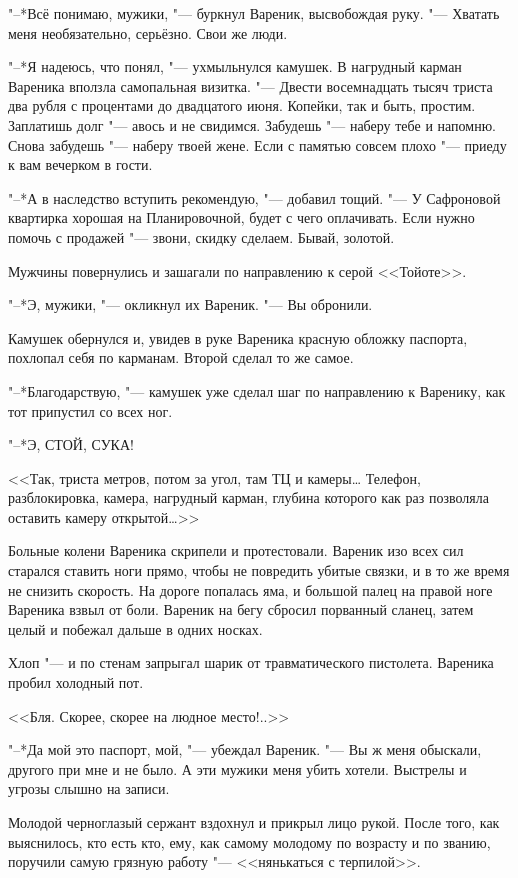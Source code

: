 "--*Всё понимаю, мужики, "--- буркнул Вареник, высвобождая руку.
"--- Хватать меня необязательно, серьёзно.
Свои же люди.

"--*Я надеюсь, что понял, "--- ухмыльнулся камушек.
В нагрудный карман Вареника вползла самопальная визитка.
"--- Двести восемнадцать тысяч триста два рубля с процентами до двадцатого июня.
Копейки, так и быть, простим.
Заплатишь долг "--- авось и не свидимся.
Забудешь "--- наберу тебе и напомню.
Снова забудешь "--- наберу твоей жене.
Если с памятью совсем плохо "--- приеду к вам вечерком в гости.

"--*А в наследство вступить рекомендую, "--- добавил тощий.
"--- У Сафроновой квартирка хорошая на Планировочной, будет с чего оплачивать.
Если нужно помочь с продажей "--- звони, скидку сделаем.
Бывай, золотой.

Мужчины повернулись и зашагали по направлению к серой <<Тойоте>>.

"--*Э, мужики, "--- окликнул их Вареник.
"--- Вы обронили.

Камушек обернулся и, увидев в руке Вареника красную обложку паспорта, похлопал себя по карманам.
Второй сделал то же самое.

"--*Благодарствую, "--- камушек уже сделал шаг по направлению к Варенику, как тот припустил со всех ног.

"--*Э, СТОЙ, СУКА!

<<Так, триста метров, потом за угол, там ТЦ и камеры\ldots{}
Телефон, разблокировка, камера, нагрудный карман, глубина которого как раз позволяла оставить камеру открытой\ldots{}>>

Больные колени Вареника скрипели и протестовали.
Вареник изо всех сил старался ставить ноги прямо, чтобы не повредить убитые связки, и в то же время не снизить скорость.
На дороге попалась яма, и большой палец на правой ноге Вареника взвыл от боли.
Вареник на бегу сбросил порванный сланец, затем целый и побежал дальше в одних носках.

Хлоп "--- и по стенам запрыгал шарик от травматического пистолета.
Вареника пробил холодный пот.

<<Бля.
Скорее, скорее на людное место!..>>

\asterism

"--*Да мой это паспорт, мой, "--- убеждал Вареник.
"--- Вы ж меня обыскали, другого при мне и не было.
А эти мужики меня убить хотели.
Выстрелы и угрозы слышно на записи.

Молодой черноглазый сержант вздохнул и прикрыл лицо рукой.
После того, как выяснилось, кто есть кто, ему, как самому молодому по возрасту и по званию, поручили самую грязную работу "--- <<нянькаться с терпилой>>.

